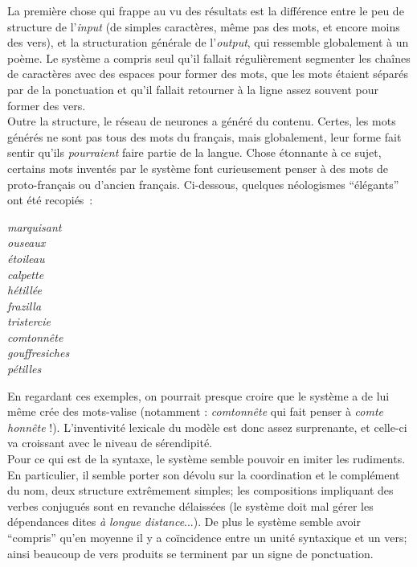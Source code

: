 \documentclass{article}
\newenvironment{citationbox}
{\begin{center}
		\begin{minipage}{.8\textwidth}
		}
		{
		\end{minipage}	
\end{center}
}
\begin{document}
					La première chose qui frappe au vu des résultats est la différence entre le peu de structure de l'\textit{input} (de simples caractères, même pas des mots, et encore moins des vers), et la structuration générale de l'\textit{output}, qui ressemble globalement à un poème. Le système a compris seul qu'il fallait régulièrement segmenter les chaînes de caractères avec des espaces pour former des mots, que les mots étaient séparés par de la ponctuation et qu'il fallait retourner à la ligne assez souvent pour former des vers.\\
					
					Outre la structure, le réseau de neurones a généré du contenu. Certes, les mots générés ne sont pas tous des mots du français, mais globalement, leur forme fait sentir qu'ils \textit{pourraient} faire partie de la langue. Chose étonnante à ce sujet, certains mots inventés par le système font curieusement penser à des mots de proto-français ou d'ancien français. Ci-dessous, quelques néologismes ``élégants'' ont été recopiés~:
					\begin{citationbox}
						\textit{marquisant}\\
						\textit{ouseaux}\\
						\textit{étoileau}\\
						\textit{calpette}\\
						\textit{hétillée}\\
						\textit{frazilla}\\
						\textit{tristercie}\\
						\textit{comtonnête}\\
						\textit{gouffresiches}\\
						\textit{pétilles}\\
					\end{citationbox}
					En regardant ces exemples, on pourrait presque croire que le système a de lui même crée des mots-valise (notamment : \textit{comtonnête} qui fait penser à \textit{comte} \textit{honnête} !). L'inventivité lexicale du modèle est donc assez surprenante, et celle-ci va croissant avec le niveau de sérendipité.\\
					
					Pour ce qui est de la syntaxe, le système semble pouvoir en imiter les rudiments. En particulier, il semble porter son dévolu sur la coordination et le complément du nom, deux structure extrêmement simples; les compositions impliquant des verbes conjugués sont en revanche délaissées (le système doit mal gérer les dépendances dites \textit{à longue distance}...). De plus le système semble avoir ``compris'' qu'en moyenne il y a coïncidence entre un unité syntaxique et un vers; ainsi beaucoup de vers produits se terminent par un signe de ponctuation.\\
					
\end{document}
